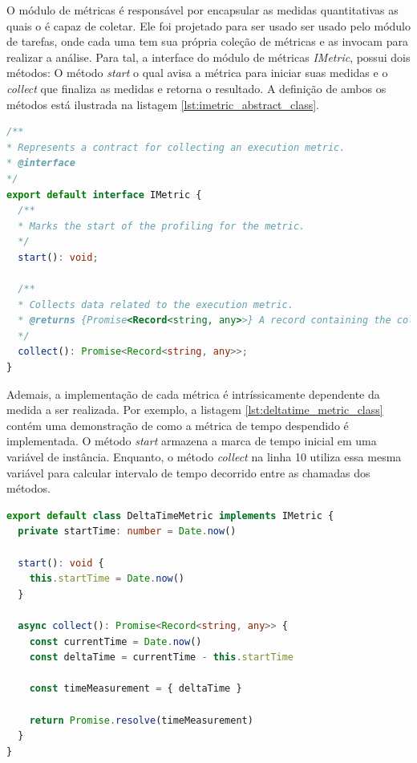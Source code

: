 \documentclass[12pt]{tcc}
\begin{document}
	O módulo de métricas é responsável por encapsular as medidas quantitativas as quais o  é capaz de coletar.
	Ele foi projetado para ser usado ser usado pelo módulo de tarefas,
	onde cada uma tem sua própria coleção de métricas e as invocam para realizar a análise.
	Para tal, a interface do módulo de métricas \emph{IMetric}, possui dois métodos: O método \emph{start} o qual avisa a métrica para iniciar suas medidas e o \emph{collect} que finaliza as medidas e retorna o resultado.
	A definição de ambos os métodos está ilustrada na listagem \ref{lst:imetric_abstract_class}.

\begin{lstlisting}[label={lst:imetric_abstract_class}, caption={[Implementação de uma métrica.]Implementação da classe responsável por representar uma métrica.}, language=TypeScript, breaklines=true]
/**
* Represents a contract for collecting an execution metric.
* @interface
*/
export default interface IMetric {
  /**
  * Marks the start of the profiling for the metric.
  */
  start(): void;

  /**
  * Collects data related to the execution metric.
  * @returns {Promise<Record<string, any>>} A record containing the collected metric data.
  */
  collect(): Promise<Record<string, any>>;
}
\end{lstlisting}

	Ademais, a implementação de cada métrica é intríssicamente dependente da medida a ser realizada.
	Por exemplo, a listagem \ref{lst:deltatime_metric_class} contém uma demonstração de como a métrica de tempo despendido é implementada.
	O método \emph{start} armazena a marca de tempo inicial em uma variável de instância.
	Enquanto, o método \emph{collect} na linha 10 utiliza essa mesma variável para calcular intervalo de tempo decorrido entre as chamadas dos métodos.

\begin{lstlisting}[label={lst:deltatime_metric_class}, caption={[Fragmento de código da métrica \emph{DeltaTimeMetric}.]Fragmento de código da métrica \emph{DeltaTimeMetric} a qual mede o tempo despendido em milisegundos.}, language=TypeScript, breaklines=true]
export default class DeltaTimeMetric implements IMetric {
  private startTime: number = Date.now()

  start(): void {
    this.startTime = Date.now()
  }

  async collect(): Promise<Record<string, any>> {
    const currentTime = Date.now()
    const deltaTime = currentTime - this.startTime
  
    const timeMeasurement = { deltaTime }
  
    return Promise.resolve(timeMeasurement)
  }
}
\end{lstlisting}
\end{document}
